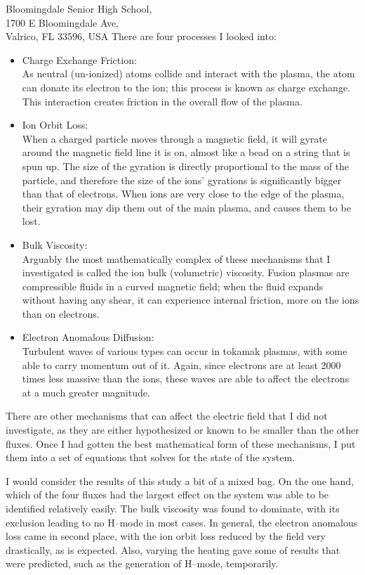\documentclass[12pt,a4paper]{letter}
\begin{document}
\begin{letter}{
	Bloomingdale Senior High School,\\
	1700 E Bloomingdale Ave,\\
	Valrico, FL 33596, USA
}
There are four processes I looked into:
\begin{itemize}
	\item Charge Exchange Friction: \\
As neutral (un-ionized) atoms collide and interact with the plasma, the atom can donate its electron to the ion; this process is known as charge exchange.
This interaction creates friction in the overall flow of the plasma.
	\item Ion Orbit Loss: \\
When a charged particle moves through a magnetic field, it will gyrate around the magnetic field line it is on, almost like a bead on a string that is spun up.
The size of the gyration is directly proportional to the mass of the particle, and therefore the size of the ions' gyrations is significantly bigger than that of electrons.
When ions are very close to the edge of the plasma, their gyration may dip them out of the main plasma, and causes them to be lost.
	\item Bulk Viscosity: \\
Arguably the most mathematically complex of these mechanisms that I investigated is called the ion bulk (volumetric) viscosity.
Fusion plasmas are compressible fluids in a curved magnetic field; when the fluid expands without having any shear, it can experience internal friction, more on the ions than on electrons.
	\item Electron Anomalous Diffusion: \\
Turbulent waves of various types can occur in tokamak plasmas, with some able to carry momentum out of it.
Again, since electrons are at least 2000 times less massive than the ions, these waves are able to affect the electrons at a much greater magnitude.
\end{itemize}

There are other mechanisms that can affect the electric field that I did not investigate, as they are either hypothesized or known to be smaller than the other fluxes.
Once I had gotten the best mathematical form of these mechanisms, I put them into a set of equations that solves for the state of the system.

I would consider the results of this study a bit of a mixed bag.
On the one hand, which of the four fluxes had the largest effect on the system was able to be identified relatively easily.
The bulk viscosity was found to dominate, with its exclusion leading to no H--mode in most cases.
In general, the electron anomalous loss came in second place, with the ion orbit loss reduced by the field very drastically, as is expected.
Also, varying the heating gave some of results that were predicted, such as the generation of H--mode, temporarily.


\end{letter}
\end{document}
